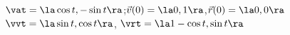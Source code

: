 {$\vat = \la \cos t,-\sin t\ra$;\quad $\vec v(0) = \la 0,1\ra$,\quad $\vec r(0) = \la 0,0\ra$
}
{$\vvt = \la \sin t,\cos t\ra$, $\vrt = \la 1-\cos t,\sin t\ra$
}